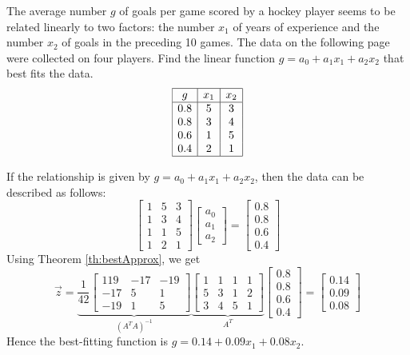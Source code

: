\documentclass{ximera}
\begin{document}
\begin{example}\label{ex:leastSquares3}
The average number $g$ of goals per game scored by a hockey player seems to be related linearly to
two factors: the number $x_1$ of years of experience and the number $x_2$ of goals in the preceding 10
games. The data on the following page were collected on four players. Find the linear function $g=a_0+a_1x_1+a_2x_2$ that best fits the data.
$$\begin{array}{|c|c|c|} 
 \hline g&x_1&x_2\\ \hline 0.8&5&3\\  0.8&3&4\\
 0.6 &1&5\\
 0.4 &2&1\\
 \hline 
 \end{array}$$

\begin{explanation}
    If the relationship is given by $g=a_0+a_1x_1+a_2x_2$, then the data can be described as follows:
    $$\begin{bmatrix}1&5&3\\1&3&4\\1&1&5\\1&2&1\end{bmatrix}\begin{bmatrix}a_0\\a_1\\a_2\end{bmatrix}=\begin{bmatrix}0.8\\0.8\\0.6\\0.4\end{bmatrix}$$
    Using Theorem \ref{th:bestApprox}, we get
    $$\vec{z}=\underbrace{\frac{1}{42}\begin{bmatrix}
        119&-17&-19\\-17&5&1\\-19&1&5
    \end{bmatrix}}_{\left(A^TA\right)^{-1}}\underbrace{\begin{bmatrix}
        1&1&1&1\\5&3&1&2\\3&4&5&1
    \end{bmatrix}}_{A^T}\begin{bmatrix}
        0.8\\0.8\\0.6\\0.4
    \end{bmatrix}=\begin{bmatrix}
        0.14\\0.09\\0.08
    \end{bmatrix}$$
    Hence the best-fitting function is $g=0.14+0.09x_1+0.08x_2$.  
\end{explanation}    
\end{example}
\end{document}
